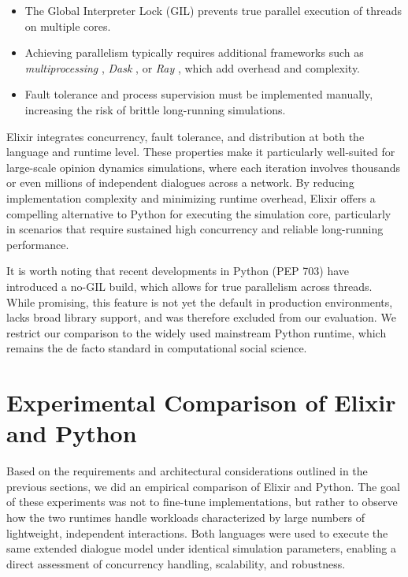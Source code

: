 \documentclass[
]{ceurart}
\begin{document}
\begin{itemize}
	\item The Global Interpreter Lock (GIL) prevents true parallel execution of threads on multiple cores. \cite{PythonThreading}
	\item Achieving parallelism typically requires additional frameworks such as \emph{multiprocessing} \cite{PythonMultiprocessing}, \emph{Dask} \cite{PythonDask}, or \emph{Ray} \cite{PythonRay}, which add overhead and complexity.
	\item Fault tolerance and process supervision must be implemented manually, increasing the risk of brittle long-running simulations.
\end{itemize}

Elixir integrates concurrency, fault tolerance, and distribution at both the language and runtime level. These properties make it particularly well-suited for large-scale opinion dynamics simulations, where each iteration involves thousands or even millions of independent dialogues across a network. By reducing implementation complexity and minimizing runtime overhead, Elixir offers a compelling alternative to Python for executing the simulation core, particularly in scenarios that require sustained high concurrency and reliable long-running performance.

It is worth noting that recent developments in Python (PEP 703) \cite{pep703} have introduced a no-GIL build, which allows for true parallelism across threads. While promising, this feature is not yet the default in production environments, lacks broad library support, and was therefore excluded from our evaluation. We restrict our comparison to the widely used mainstream Python runtime, which remains the de facto standard in computational social science.



\section{Experimental Comparison of Elixir and Python}
Based on the requirements and architectural considerations outlined in the previous sections, we did an empirical comparison of Elixir and Python. The goal of these experiments was not to fine-tune implementations, but rather to observe how the two runtimes handle workloads characterized by large numbers of lightweight, independent interactions. Both languages were used to execute the same extended dialogue model under identical simulation parameters, enabling a direct assessment of concurrency handling, scalability, and robustness.
\end{document}
